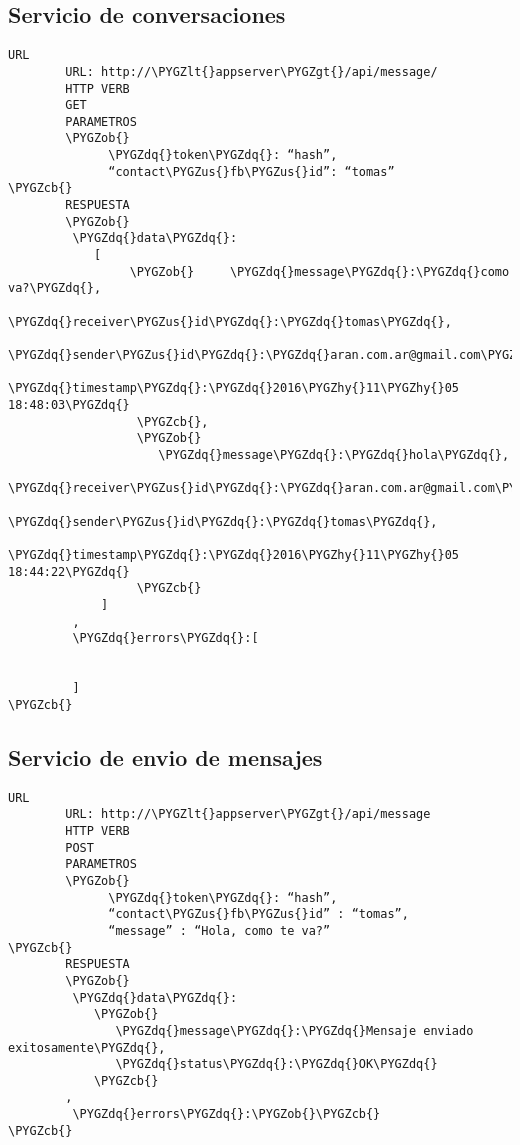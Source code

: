 \documentclass[a4paper,10pt,spanish]{sphinxmanual}
\def\PYGZus{\char`\_}
\def\PYGZob{\char`\{}
\def\PYGZcb{\char`\}}
\def\PYGZlt{\char`\<}
\def\PYGZgt{\char`\>}
\def\PYGZhy{\char`\-}
\def\PYGZdq{\char`\"}
\begin{document}
\subsection{Servicio de conversaciones}
\label{apiRest:servicio-de-conversaciones}
\begin{Verbatim}[commandchars=\\\{\}]
URL
        URL: http://\PYGZlt{}appserver\PYGZgt{}/api/message/
        HTTP VERB
        GET
        PARAMETROS
        \PYGZob{}
              \PYGZdq{}token\PYGZdq{}: “hash”,
              “contact\PYGZus{}fb\PYGZus{}id”: “tomas”
\PYGZcb{}
        RESPUESTA
        \PYGZob{}
         \PYGZdq{}data\PYGZdq{}:
            [
                 \PYGZob{}     \PYGZdq{}message\PYGZdq{}:\PYGZdq{}como va?\PYGZdq{},
                     \PYGZdq{}receiver\PYGZus{}id\PYGZdq{}:\PYGZdq{}tomas\PYGZdq{},
                     \PYGZdq{}sender\PYGZus{}id\PYGZdq{}:\PYGZdq{}aran.com.ar@gmail.com\PYGZdq{},
                     \PYGZdq{}timestamp\PYGZdq{}:\PYGZdq{}2016\PYGZhy{}11\PYGZhy{}05 18:48:03\PYGZdq{}
                  \PYGZcb{},
                  \PYGZob{}
                     \PYGZdq{}message\PYGZdq{}:\PYGZdq{}hola\PYGZdq{},
                     \PYGZdq{}receiver\PYGZus{}id\PYGZdq{}:\PYGZdq{}aran.com.ar@gmail.com\PYGZdq{},
                     \PYGZdq{}sender\PYGZus{}id\PYGZdq{}:\PYGZdq{}tomas\PYGZdq{},
                     \PYGZdq{}timestamp\PYGZdq{}:\PYGZdq{}2016\PYGZhy{}11\PYGZhy{}05 18:44:22\PYGZdq{}
                  \PYGZcb{}
             ]
         ,
         \PYGZdq{}errors\PYGZdq{}:[


         ]
\PYGZcb{}
\end{Verbatim}


\subsection{Servicio de envio de mensajes}
\label{apiRest:servicio-de-envio-de-mensajes}
\begin{Verbatim}[commandchars=\\\{\}]
URL
        URL: http://\PYGZlt{}appserver\PYGZgt{}/api/message
        HTTP VERB
        POST
        PARAMETROS
        \PYGZob{}
              \PYGZdq{}token\PYGZdq{}: “hash”,
              “contact\PYGZus{}fb\PYGZus{}id” : “tomas”,
              “message” : “Hola, como te va?”
\PYGZcb{}
        RESPUESTA
        \PYGZob{}
         \PYGZdq{}data\PYGZdq{}:
            \PYGZob{}
               \PYGZdq{}message\PYGZdq{}:\PYGZdq{}Mensaje enviado exitosamente\PYGZdq{},
               \PYGZdq{}status\PYGZdq{}:\PYGZdq{}OK\PYGZdq{}
            \PYGZcb{}
        ,
         \PYGZdq{}errors\PYGZdq{}:\PYGZob{}\PYGZcb{}
\PYGZcb{}
\end{Verbatim}
\end{document}
